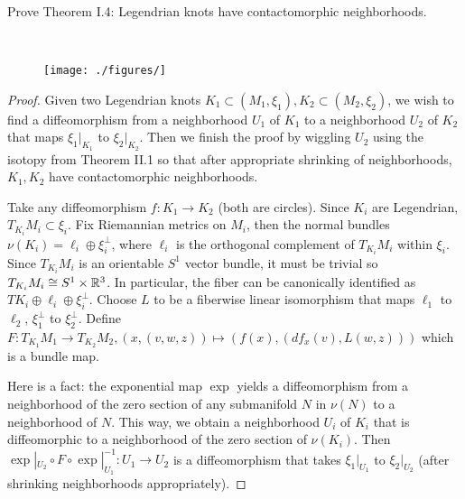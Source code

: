 \documentclass[12pt]{article}
\begin{document}
\begin{problem}[4]
Prove Theorem I.4: Legendrian knots have contactomorphic neighborhoods. 
\end{problem}
~\begin{figure}[H]
	\centering
	\texttt{[image: ./figures/]}
	\caption{}
	\label{fig:}
\end{figure}
\begin{proof}
Given two Legendrian knots $ K_1 \subset (M_1,\xi_1), K_2 \subset (M_2,\xi_2)$, we wish to find a diffeomorphism from a neighborhood $ U_1$ of $ K_1$ to a neighborhood $ U_2$ of $ K_2$ that maps $ \xi_1|_{K_1}$ to $ \xi_2|_{K_2}$. Then we finish the proof by wiggling $ U_2$ using the isotopy from Theorem II.1 so that after appropriate shrinking of neighborhoods, $ K_1,K_2$ have contactomorphic neighborhoods.

Take any diffeomorphism $ f: K_1 \to K_2$ (both are circles). Since $ K_i$ are Legendrian, $ T_{K_i}M_i \subset \xi_i$. Fix Riemannian metrics on $ M_i$, then the normal bundles $ \nu(K_i) = \ell_i \oplus \xi_i^{\perp}$, where $ \ell_i$ is the orthogonal complement of $ T_{K_i}M_i$ within $ \xi_i$.  Since $ T_{K_i}M_i$ is an orientable $ S^{1}$ vector bundle, it must be trivial so $ T_{K_i}M_i \cong S^{1} \times \mathbb{R}^3$. In particular, the fiber can be canonically identified as $ TK_i  \oplus \ell_i\oplus \xi_i^{\perp}$. Choose $ L$ to be a fiberwise linear isomorphism that maps $ \ell_1$ to $ \ell_2$, $\xi_1^{\perp}$ to $\xi_2^{\perp}$. Define $ F: T_{K_1}M_1 \to T_{K_2}M_2, (x,(v,w,z)) \mapsto (f(x),(df_x(v), L(w,z)))$ which is a bundle map.

Here is a fact: the exponential map $ \exp$ yields a diffeomorphism from a neighborhood of the zero section of any submanifold $ N$ in $ \nu(N)$ to a neighborhood of $ N$. This way, we obtain a neighborhood $ U_i$ of $ K_i$ that is diffeomorphic to a neighborhood of the zero section of $ \nu(K_i)$. Then $ \exp|_{U_2} \circ F \circ \exp|_{U_1}^{-1}:U_1 \to U_2$ is a diffeomorphism that takes $ \xi_1|_{U_1}$ to $ \xi_2|_{U_2}$ (after shrinking neighborhoods appropriately).
\end{proof}
\end{document}
